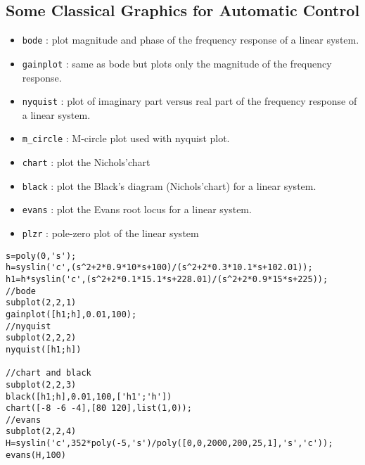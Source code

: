 \subsection{Some Classical Graphics for Automatic Control}

\begin{itemize}

	\item  \verb+bode+	: plot magnitude and phase of the 
frequency response of a linear system.

	\item  \verb+gainplot+	: same as bode but plots only the 
magnitude of the frequency response.

	\item  \verb+nyquist+	: plot of imaginary part versus real 
part of the frequency response of a linear system.

	\item  \verb+m_circle+	: M-circle plot used with nyquist plot.

	\item  \verb+chart+	: plot the Nichols'chart 

	\item  \verb+black+	: plot the Black's diagram (Nichols'chart)
for a linear system.  

	\item  \verb+evans+	: plot the Evans root locus for a
linear system.

	\item  \verb+plzr+	: pole-zero plot of the linear system

\end{itemize}

\begin{verbatim}
s=poly(0,'s');
h=syslin('c',(s^2+2*0.9*10*s+100)/(s^2+2*0.3*10.1*s+102.01));
h1=h*syslin('c',(s^2+2*0.1*15.1*s+228.01)/(s^2+2*0.9*15*s+225));
//bode
subplot(2,2,1)
gainplot([h1;h],0.01,100);
//nyquist
subplot(2,2,2)
nyquist([h1;h])

//chart and black 
subplot(2,2,3)
black([h1;h],0.01,100,['h1';'h'])
chart([-8 -6 -4],[80 120],list(1,0));
//evans
subplot(2,2,4)
H=syslin('c',352*poly(-5,'s')/poly([0,0,2000,200,25,1],'s','c'));
evans(H,100)
\end{verbatim}




%
